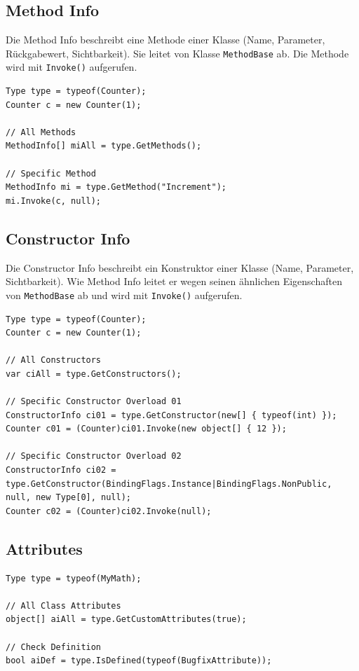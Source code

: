 \clearpage

\subsection{Method Info}
Die Method Info beschreibt eine Methode einer Klasse (Name, Parameter, Rückgabewert, Sichtbarkeit). Sie leitet von Klasse \lstinline|MethodBase| ab. Die Methode wird mit \lstinline|Invoke()| aufgerufen.
\begin{lstlisting}[caption=Reflection: Method Info]
Type type = typeof(Counter);
Counter c = new Counter(1);

// All Methods
MethodInfo[] miAll = type.GetMethods();

// Specific Method
MethodInfo mi = type.GetMethod("Increment");
mi.Invoke(c, null);
\end{lstlisting}

\subsection{Constructor Info}
Die Constructor Info beschreibt ein Konstruktor einer Klasse (Name, Parameter, Sichtbarkeit). Wie Method Info leitet er wegen seinen ähnlichen Eigenschaften von \lstinline|MethodBase| ab und wird  mit \lstinline|Invoke()| aufgerufen.
\begin{lstlisting}[caption=Reflection: Constructor Info]
Type type = typeof(Counter);
Counter c = new Counter(1);

// All Constructors
var ciAll = type.GetConstructors();

// Specific Constructor Overload 01
ConstructorInfo ci01 = type.GetConstructor(new[] { typeof(int) });
Counter c01 = (Counter)ci01.Invoke(new object[] { 12 });

// Specific Constructor Overload 02
ConstructorInfo ci02 = type.GetConstructor(BindingFlags.Instance|BindingFlags.NonPublic, null, new Type[0], null);
Counter c02 = (Counter)ci02.Invoke(null);
\end{lstlisting}

\subsection{Attributes}
\begin{lstlisting}[caption=Reflection: Attributes]
Type type = typeof(MyMath);

// All Class Attributes
object[] aiAll = type.GetCustomAttributes(true);

// Check Definition
bool aiDef = type.IsDefined(typeof(BugfixAttribute));
\end{lstlisting}

